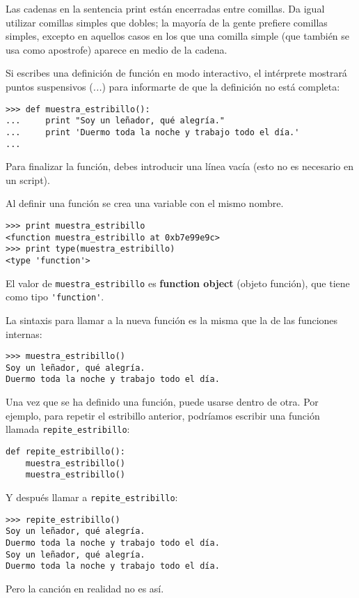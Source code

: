 Las cadenas en la sentencia print están encerradas entre
comillas. Da igual utilizar comillas simples que dobles;
la mayoría de la gente prefiere comillas simples, excepto en aquellos casos en los que
una comilla simple (que también se usa como apostrofe) aparece en medio de la cadena.


Si escribes una definición de función en modo interactivo, el intérprete
mostrará puntos suspensivos (\emph{...}) para informarte de que la definición
no está completa:

\beforeverb
\begin{verbatim}
>>> def muestra_estribillo():
...     print "Soy un leñador, qué alegría."
...     print 'Duermo toda la noche y trabajo todo el día.'
...
\end{verbatim}
\afterverb
%
Para finalizar la función, debes introducir una línea vacía (esto no
es necesario en un script).

Al definir una función se crea una variable con el mismo nombre.

\beforeverb
\begin{verbatim}
>>> print muestra_estribillo
<function muestra_estribillo at 0xb7e99e9c>
>>> print type(muestra_estribillo)
<type 'function'>
\end{verbatim}
\afterverb
%
El valor de \verb"muestra_estribillo" es {\bf function object} (objeto función), que
tiene como tipo \verb"'function'".


La sintaxis para llamar a la nueva función es la misma que
la de las funciones internas:

\beforeverb
\begin{verbatim}
>>> muestra_estribillo()
Soy un leñador, qué alegría.
Duermo toda la noche y trabajo todo el día.
\end{verbatim}
\afterverb
%
Una vez que se ha definido una función, puede usarse dentro de otra.
Por ejemplo, para repetir el estribillo anterior, podríamos escribir
una función llamada \verb"repite_estribillo":

\beforeverb
\begin{verbatim}
def repite_estribillo():
    muestra_estribillo()
    muestra_estribillo()
\end{verbatim}
\afterverb
%
Y después llamar a \verb"repite_estribillo":

\beforeverb
\begin{verbatim}
>>> repite_estribillo()
Soy un leñador, qué alegría.
Duermo toda la noche y trabajo todo el día.
Soy un leñador, qué alegría.
Duermo toda la noche y trabajo todo el día.
\end{verbatim}
\afterverb
%
Pero la canción en realidad no es así.

